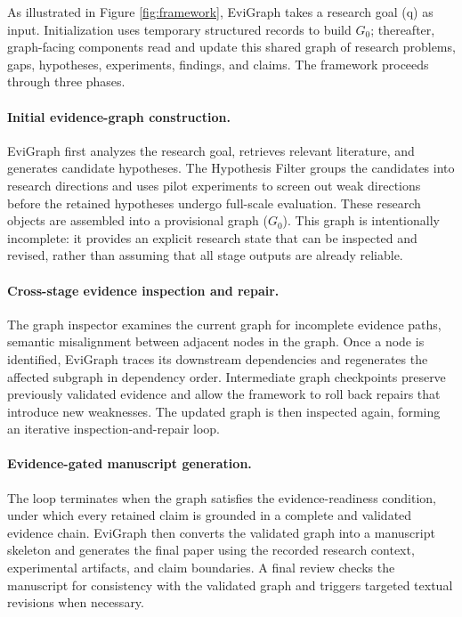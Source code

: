 \documentclass[letterpaper]{article} %
\begin{document}
As illustrated in Figure \ref{fig:framework}, EviGraph takes a research goal (q) as input. Initialization uses temporary structured records to build $G_0$; thereafter, graph-facing components read and update this shared graph of research problems, gaps, hypotheses, experiments, findings, and claims. The framework proceeds through three phases.

\paragraph{Initial evidence-graph construction.} EviGraph first analyzes the research goal, retrieves relevant literature, and generates candidate hypotheses. The Hypothesis Filter groups the candidates into research directions and uses pilot experiments to screen out weak directions before the retained hypotheses undergo full-scale evaluation. These research objects are assembled into a provisional graph ($G_0$). This graph is intentionally incomplete: it provides an explicit research state that can be inspected and revised, rather than assuming that all stage outputs are already reliable.

\paragraph{Cross-stage evidence inspection and repair.} The graph inspector examines the current graph for incomplete evidence paths, semantic misalignment between adjacent nodes in the graph. Once a node is identified, EviGraph traces its downstream dependencies and regenerates the affected subgraph in dependency order. Intermediate graph checkpoints preserve previously validated evidence and allow the framework to roll back repairs that introduce new weaknesses. The updated graph is then inspected again, forming an iterative inspection-and-repair loop.

\paragraph{Evidence-gated manuscript generation.} The loop terminates when the graph satisfies the evidence-readiness condition, under which every retained claim is grounded in a complete and validated evidence chain. EviGraph then converts the validated graph into a manuscript skeleton and generates the final paper using the recorded research context, experimental artifacts, and claim boundaries. A final review checks the manuscript for consistency with the validated graph and triggers targeted textual revisions when necessary. 
\end{document}
